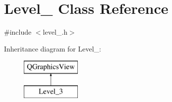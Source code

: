 \hypertarget{class_level__3}{}\section{Level\+\_ Class Reference}
\label{class_level__3}


{\ttfamily \#include $<$level\+\_.\+h$>$}

Inheritance diagram for Level\+\_\+:\begin{figure}[H]
\begin{center}
\leavevmode
\includegraphics[height=2.000000cm]{class_level__3}
\end{center}
\end{figure}
